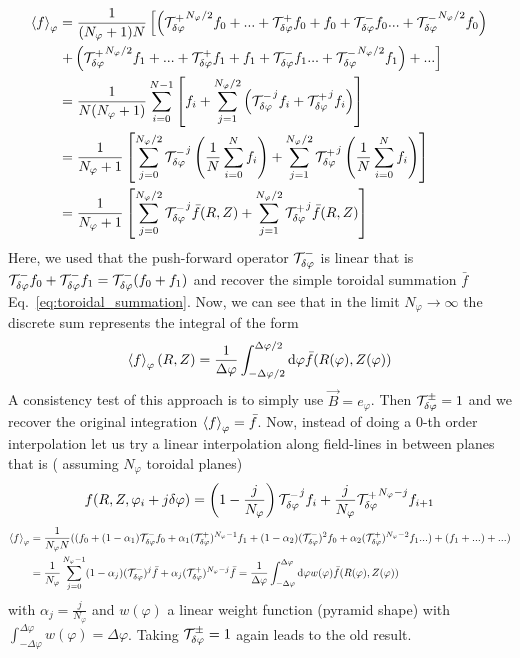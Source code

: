\begin{align}
    \left \langle f \right \rangle_\varphi &= \frac{1}{(N_\varphi+1) N} \left[\left(
    {\mathcal T^+_{\delta\varphi}}^{N_\varphi/2} f_0 + ... + \mathcal T^+_{\delta\varphi} f_0 + f_0 + \mathcal T^-_{\delta\varphi} f_0 ... + {\mathcal T^-_{\delta\varphi}}^{N_\varphi/2} f_0\right)\right. \nonumber\\
    &\left. +\left( {\mathcal T^+_{\delta\varphi}}^{N_\varphi/2} f_1 + ... + \mathcal T^+_{\delta\varphi} f_1 + f_1 + \mathcal T^-_{\delta\varphi} f_1 ... + {\mathcal T^-_{\delta\varphi}}^{N_\varphi/2} f_1\right)  + ... \right] \nonumber\\
    &= \frac{1}{N (N_\varphi+1)} \sum_{i=0}^{N-1} \left[f_i + \sum_{j=1}^{N_\varphi/2} \left( {\mathcal T^-_{\delta\varphi}}^j f_i + {\mathcal T^+_{\delta\varphi}}^jf_i\right)\right] \nonumber\\
    &=
    \frac{1}{N_\varphi+1} \left[ \sum_{j=0}^{N_\varphi/2}  {\mathcal T^-_{\delta\varphi}}^j \left(\frac{1}{N}\sum_{i=0}^{N} f_i\right)
    +
    \sum_{j=1}^{N_\varphi/2}  {\mathcal T^+_{\delta\varphi}}^j \left(\frac{1}{N}\sum_{i=0}^{N} f_i\right)\right]
    \nonumber\\
    &=
    \frac{1}{N_\varphi+1} \left[ \sum_{j=0}^{N_\varphi/2}  {\mathcal T^-_{\delta\varphi}}^j \bar f(R,Z)
    +
    \sum_{j=1}^{N_\varphi/2}  {\mathcal T^+_{\delta\varphi}}^j \bar f(R,Z)\right]
\end{align}
Here, we used that the push-forward operator $\mathcal T^-_{\delta\varphi}$ is linear that is $\mathcal T^-_{\delta\varphi} f_0 + \mathcal T^-_{\delta\varphi} f_1 = \mathcal T^-_{\delta\varphi} (f_0+f_1)$
and recover the simple toroidal summation $\bar f$ Eq.~\eqref{eq:toroidal_summation}.
Now, we can see that in the limit $N_\varphi \rightarrow\infty$ the discrete sum represents the integral
of the form
\begin{align}
    \left \langle f \right \rangle_\varphi(R,Z) = \frac{1}{\Delta\varphi}\int_{-\Delta\varphi/2}^{\Delta\varphi/2}\mathrm{d}\varphi \bar f(R(\varphi),Z(\varphi))
\end{align}
A consistency test of this approach is to simply use $\vec B = e_\varphi$. Then
$\mathcal T^\pm_{\delta\varphi} = 1$ and we recover the original integration $\left \langle f \right \rangle_\varphi= \bar f$.
Now, instead of doing a 0-th order interpolation let us try a linear interpolation along field-lines in between planes that is ( assuming $N_\varphi$ toroidal planes)
\begin{align}
    f(R,Z,\varphi_i + j\delta\varphi) = \left(1-\frac{j}{N_\varphi}\right){\mathcal T^-_{\delta\varphi}}^j f_i + \frac{j}{N_\varphi} {\mathcal T^+_{\delta\varphi}}^{N_\varphi -j}f_{i+1}
\end{align}
\begin{align}
    \left \langle  f \right \rangle_\varphi &= \frac{1}{N_\varphi N} (( f_0 + (1-\alpha_1)\mathcal T^-_{\delta\varphi} f_0 + \alpha_1 (\mathcal T^+_{\delta\varphi})^{N_\varphi -1} f_1 + (1-\alpha_2)(\mathcal T^-_{\delta\varphi})^2 f_0 + \alpha_2 (\mathcal T^+_{\delta\varphi})^{N_\varphi-2} f_1 ...  )+ (f_1 + ...) + ...)\nonumber\\
    &= \frac{1}{ N_\varphi} \sum_{j=0}^{N_\varphi-1}  (1-\alpha_j)(\mathcal T^-_{\delta\varphi})^j \bar f+\alpha_j (\mathcal T^+_{\delta\varphi})^{N_\varphi -j} \bar f
    = \frac{1}{\Delta\varphi}\int_{-\Delta\varphi}^{\Delta\varphi}\mathrm{d}\varphi w(\varphi) \bar f (R(\varphi),Z(\varphi))
    \label{eq:cta}
\end{align}
with $\alpha_j = \frac{j}{N_\varphi}$ and $w(\varphi)$ a linear weight function (pyramid shape) with $\int_{-\Delta\varphi}^{\Delta\varphi} w(\varphi) = \Delta\varphi$. Taking $\mathcal T^\pm_{\delta\varphi}=1$ again leads to the old result.


